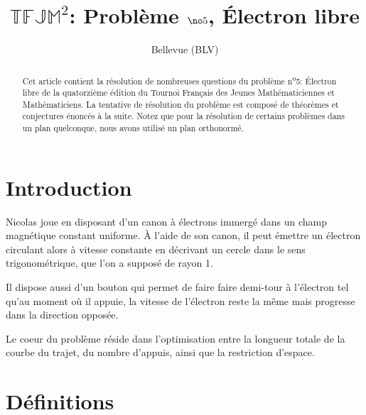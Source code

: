 \documentclass[a4paper]{amsart}
\theoremstyle{definition}
\theoremstyle{remark}
\numberwithin{equation}{section}
\begin{document}
\title{$\mathbb{TFJM}^2$: Problème $\no5$, Électron libre}

\author{Bellevue (BLV)}

\begin{abstract}
  Cet article contient la résolution de nombreuses questions du problème n\textsuperscript{o}5: \og Électron libre \fg{} de la quatorzième édition du Tournoi Français
  des Jeunes Mathématiciennes et Mathématiciens. La tentative de résolution du problème est composé de théorèmes et conjectures énoncés à la suite.
  Notez que pour la résolution de certains problèmes dans un plan quelconque, nous avons utilisé un plan orthonormé.

\end{abstract}

\maketitle

\tableofcontents

\section{Introduction}

Nicolas joue en disposant d’un canon à électrons immergé dans un champ magnétique constant uniforme. À l'aide de son canon, il peut émettre un électron
circulant alors à vitesse constante en décrivant un cercle dans le sens trigonométrique, que l'on a supposé de rayon 1.

Il dispose aussi d’un bouton qui permet de faire faire demi-tour à l’électron tel qu'au moment où il appuie, la vitesse de l’électron reste la même
mais progresse dans la direction opposée.

Le coeur du problème réside dans l'optimisation entre la longueur totale de la courbe du trajet, du nombre d'appuis, ainsi que la restriction d'espace.\newpage
\section{Définitions}
\end{document}
